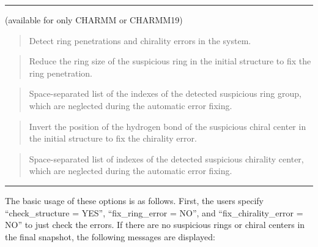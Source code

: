 \documentclass[a4paper,11pt,oneside,english]{sphinxmanual}
\begin{document}
\bigskip\hrule\bigskip


  (available for only CHARMM or CHARMM19)
\begin{quote}


Detect ring penetrations and chirality errors in the system.
\end{quote}

 
\begin{quote}


Reduce the ring size of the suspicious ring in the initial structure to fix the ring penetration.
\end{quote}

 
\begin{quote}


Space-separated list of the indexes of the detected suspicious ring group, which are neglected during the automatic error fixing.
\end{quote}

 
\begin{quote}


Invert the position of the hydrogen bond of the suspicious chiral center in the initial structure to fix the chirality error.
\end{quote}

 
\begin{quote}


Space-separated list of indexes of the detected suspicious chirality center, which are neglected during the automatic error fixing.
\end{quote}


\bigskip\hrule\bigskip


The basic usage of these options is as follows.
First, the users specify “check\_structure = YES”, “fix\_ring\_error = NO”, and “fix\_chirality\_error = NO” to just check the errors.
If there are no suspicious rings or chiral centers in the final snapshot, the following messages are displayed:
\end{document}
